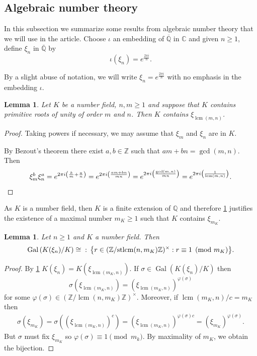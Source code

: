 \documentclass{amsart}
\def\set#1{{\def\st{\;:\;}\left\{#1\right\}}}
\def\ZZ{\mathbb Z}
\def\QQ{\mathbb Q}
\def\CC{\mathbb C}
\def\Q-{\overline{\mathbb Q}}
\DeclareMathOperator{\Gal}{Gal}
\DeclareMathOperator{\st}{st}
\DeclareMathOperator{\lcm}{lcm}
\newtheorem{lemma}[proposition]{Lemma}
\theoremstyle{definition}
\begin{document}
\subsection{Algebraic number theory}

In this subsection we summarize some results from algebraic number theory that we will use in the article. Choose $\iota$ an embedding of $\Q-$ in $\CC$ and given $n \geq 1$, define $\xi_n$ in $\Q-$ by $$\iota(\xi_n) = e^{\frac{2 \pi i}{n}}.$$

By a slight abuse of notation, we will write $\xi_n = e^{\frac{2 \pi i}{n}}$ with no emphasis in the embedding $\iota$.

\begin{lemma}
Let $K$ be a number field, $n,m \geq 1$ and suppose that $K$ contains primitive roots of unity of order $m$ and $n$. Then $K$ contains $\xi_{\lcm(m,n)}$.
\label{lemma: composition of roots of unity}
\end{lemma}

\begin{proof}
Taking powers if necessary, we may assume that $\xi_m$ and $\xi_n$ are in $K$.

By Bezout's theorem there exist $a,b \in \ZZ$ such that $am+bn = \gcd(m,n)$. Then
\begin{equation*}
\xi_m^b \xi_n^a = e^{2 \pi i \left(\frac{b}{m} + \frac{a}{n} \right)} = e^{2 \pi i \left(\frac{am+bn}{mn} \right)} = e^{2 \pi i \left(\frac{\gcd(m,n)}{mn} \right)} = e^{2 \pi i \left(\frac{1}{\lcm(m,n)} \right)}. \qedhere
\end{equation*}
\end{proof}

As $K$ is a number field, then $K$ is a finite extension of $\QQ$ and therefore \cref{lemma: composition of roots of unity} justifies the existence of a maximal number $m_K \geq 1$ such that $K$ contains $\xi_{m_K}$.

\begin{lemma}
\label{lemma: Galois group cyclotomic extension}
Let $n \geq 1$ and $K$ a number field. Then 
\begin{align*}
\Gal \left( K(\xi_n)/K \right) \cong \set{r \in (\ZZ/\lcm(n,m_K)\ZZ)^\times: r \equiv 1 \pmod{m_K}}.
\end{align*}
\end{lemma}

\begin{proof}
By \cref{lemma: composition of roots of unity} $K(\xi_n) = K(\xi_{\lcm(m_K,n)})$. If $\sigma \in \Gal(K(\xi_n)/K)$ then $$\sigma(\xi_{\lcm(m_K,n)}) = (\xi_{\lcm(m_K,n)})^{\varphi(\sigma)}$$ for some $\varphi(\sigma) \in (\ZZ/\lcm(n,m_K)\ZZ)^\times$. Moreover, if $\lcm(m_K,n)/c = m_K$ then 
\begin{align*}
\sigma(\xi_{m_K}) = \sigma((\xi_{\lcm(m_K,n)})^c) = (\xi_{\lcm(m_K,n)})^{\varphi(\sigma)c} = (\xi_{m_K})^{\varphi(\sigma)}.
\end{align*}
But $\sigma$ must fix $\xi_{m_K}$ so $\varphi(\sigma) \equiv 1 \pmod{m_k}$. By maximality of $m_K$, we obtain the bijection.
\end{proof}
\end{document}
